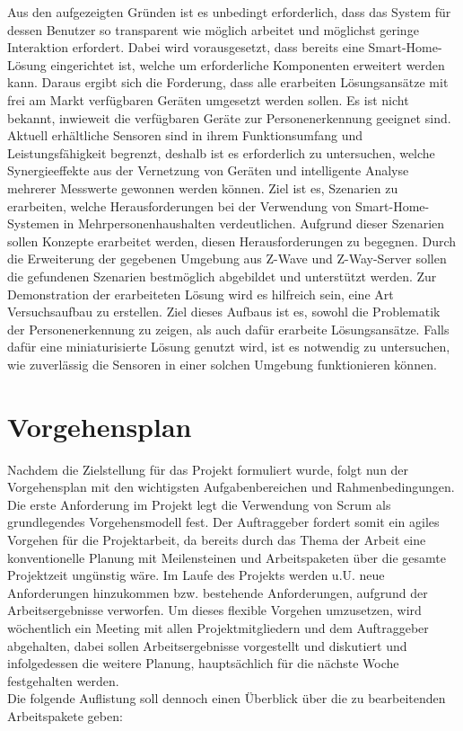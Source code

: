 \documentclass[12pt, oneside, smallheadings]{scrbook}
\begin{document}
Aus den aufgezeigten Gründen ist es unbedingt erforderlich, dass das System für dessen Benutzer so transparent wie möglich arbeitet und möglichst geringe Interaktion erfordert. Dabei wird vorausgesetzt, dass bereits eine Smart-Home-Lösung eingerichtet ist, welche um erforderliche Komponenten erweitert werden kann. Daraus ergibt sich die Forderung, dass alle erarbeiten Lösungsansätze mit frei am Markt verfügbaren Geräten umgesetzt werden sollen.
Es ist nicht bekannt, inwieweit die verfügbaren Geräte zur Personenerkennung geeignet sind. Aktuell erhältliche Sensoren sind in ihrem Funktionsumfang und Leistungsfähigkeit begrenzt, deshalb ist es erforderlich zu untersuchen, welche Synergieeffekte aus der Vernetzung von Geräten und intelligente Analyse mehrerer Messwerte gewonnen werden können.
Ziel ist es, Szenarien zu erarbeiten, welche Herausforderungen bei der Verwendung von Smart-Home-Systemen in Mehrpersonenhaushalten verdeutlichen. Aufgrund dieser Szenarien sollen Konzepte erarbeitet werden, diesen Herausforderungen zu begegnen. Durch die Erweiterung der gegebenen Umgebung aus Z-Wave und Z-Way-Server sollen die gefundenen Szenarien bestmöglich abgebildet und unterstützt werden.
Zur Demonstration der erarbeiteten Lösung wird es hilfreich sein, eine Art Versuchsaufbau zu erstellen. Ziel dieses Aufbaus ist es, sowohl die Problematik der Personenerkennung zu zeigen, als auch dafür erarbeite Lösungsansätze. Falls dafür eine miniaturisierte Lösung genutzt wird, ist es notwendig zu untersuchen, wie zuverlässig die Sensoren in einer solchen Umgebung funktionieren können.

\chapter{Vorgehensplan}

Nachdem die Zielstellung für das Projekt formuliert wurde, folgt nun der Vorgehensplan mit den wichtigsten Aufgabenbereichen und Rahmenbedingungen. Die erste Anforderung im Projekt legt die Verwendung von Scrum als grundlegendes Vorgehensmodell fest. Der Auftraggeber fordert somit ein agiles Vorgehen für die Projektarbeit, da bereits durch das Thema der Arbeit eine konventionelle Planung mit Meilensteinen und Arbeitspaketen über die gesamte Projektzeit ungünstig wäre. Im Laufe des Projekts werden u.U. neue Anforderungen hinzukommen bzw. bestehende Anforderungen, aufgrund der Arbeitsergebnisse verworfen. Um dieses flexible Vorgehen umzusetzen, wird wöchentlich ein Meeting mit allen Projektmitgliedern und dem Auftraggeber abgehalten, dabei sollen Arbeitsergebnisse vorgestellt und diskutiert und infolgedessen die weitere Planung, hauptsächlich für die nächste Woche festgehalten werden.\\
Die folgende Auflistung soll dennoch einen Überblick über die zu bearbeitenden \glqq Arbeitspakete\grqq{} geben:\\
\end{document}
